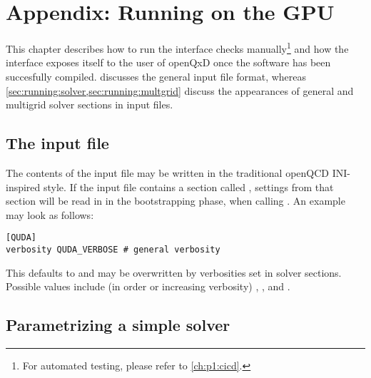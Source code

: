 \chapter{Appendix: Running on the GPU}
\label{ch:appendix:running}


This chapter describes how to run the interface checks manually\footnote{For automated testing, please refer to \cref{ch:p1:cicd}.} and how the interface exposes itself to the user of openQxD once the software has been succesfully compiled.
 discusses the general input file format, whereas \cref{sec:running:solver,sec:running:multgrid} discuss the appearances of general and multigrid solver sections in input files.

\section{The input file}
\label{sec:running:infile}

The contents of the input file may be written in the traditional openQCD INI-inspired style.
If the input file contains a section called , settings from that section will be read in in the bootstrapping phase, \ie when calling .
An example may look as follows:
\begin{verbatim}
[QUDA]
verbosity QUDA_VERBOSE # general verbosity
\end{verbatim}
This defaults to  and may be overwritten by verbosities set in solver sections.
Possible values include (in order or increasing verbosity) , ,  and .

\section{Parametrizing a simple solver}
\label{sec:running:solver}

